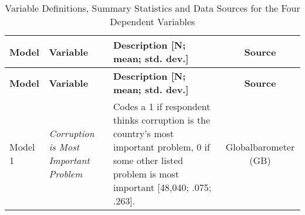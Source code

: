 \documentclass[11pt,]{article}
\begin{document}
\begin{longtable}[]{@{}lllc@{}}
\caption{Variable Definitions, Summary Statistics and Data Sources for
the Four Dependent Variables}\tabularnewline
\toprule
\begin{minipage}[b]{0.10\columnwidth}\raggedright\strut
\textbf{Model}\strut
\end{minipage} & \begin{minipage}[b]{0.14\columnwidth}\raggedright\strut
\textbf{Variable}\strut
\end{minipage} & \begin{minipage}[b]{0.37\columnwidth}\raggedright\strut
\textbf{Description {[}N; mean; std. dev.{]}}\strut
\end{minipage} & \begin{minipage}[b]{0.21\columnwidth}\centering\strut
\textbf{Source}\strut
\end{minipage}\tabularnewline
\midrule
\endfirsthead
\toprule
\begin{minipage}[b]{0.10\columnwidth}\raggedright\strut
\textbf{Model}\strut
\end{minipage} & \begin{minipage}[b]{0.14\columnwidth}\raggedright\strut
\textbf{Variable}\strut
\end{minipage} & \begin{minipage}[b]{0.37\columnwidth}\raggedright\strut
\textbf{Description {[}N; mean; std. dev.{]}}\strut
\end{minipage} & \begin{minipage}[b]{0.21\columnwidth}\centering\strut
\textbf{Source}\strut
\end{minipage}\tabularnewline
\midrule
\endhead
\begin{minipage}[t]{0.10\columnwidth}\raggedright\strut
Model 1\strut
\end{minipage} & \begin{minipage}[t]{0.14\columnwidth}\raggedright\strut
\emph{Corruption is Most Important Problem}\strut
\end{minipage} & \begin{minipage}[t]{0.37\columnwidth}\raggedright\strut
Codes a 1 if respondent thinks corruption is the country's most
important problem, 0 if some other listed problem is most important
{[}48,040; .075; .263{]}.\strut
\end{minipage} & \begin{minipage}[t]{0.21\columnwidth}\centering\strut
Globalbarometer (GB)\strut
\end{minipage}\tabularnewline

\end{longtable}
\end{document}
